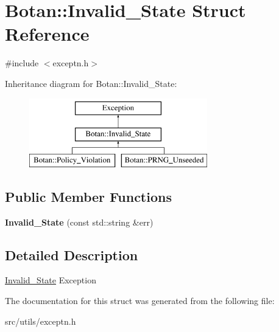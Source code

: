 \hypertarget{structBotan_1_1Invalid__State}{\section{Botan\-:\-:Invalid\-\_\-\-State Struct Reference}
\label{structBotan_1_1Invalid__State}
}


{\ttfamily \#include $<$exceptn.\-h$>$}

Inheritance diagram for Botan\-:\-:Invalid\-\_\-\-State\-:\begin{figure}[H]
\begin{center}
\leavevmode
\includegraphics[height=3.000000cm]{structBotan_1_1Invalid__State}
\end{center}
\end{figure}
\subsection*{Public Member Functions}
\begin{DoxyCompactItemize}
\item 
\hypertarget{structBotan_1_1Invalid__State_a7a8e176dda2ce038d3ed55be8a571bae}{{\bfseries Invalid\-\_\-\-State} (const std\-::string \&err)}\label{structBotan_1_1Invalid__State_a7a8e176dda2ce038d3ed55be8a571bae}

\end{DoxyCompactItemize}


\subsection{Detailed Description}
\hyperlink{structBotan_1_1Invalid__State}{Invalid\-\_\-\-State} Exception 

The documentation for this struct was generated from the following file\-:\begin{DoxyCompactItemize}
\item 
src/utils/exceptn.\-h\end{DoxyCompactItemize}

